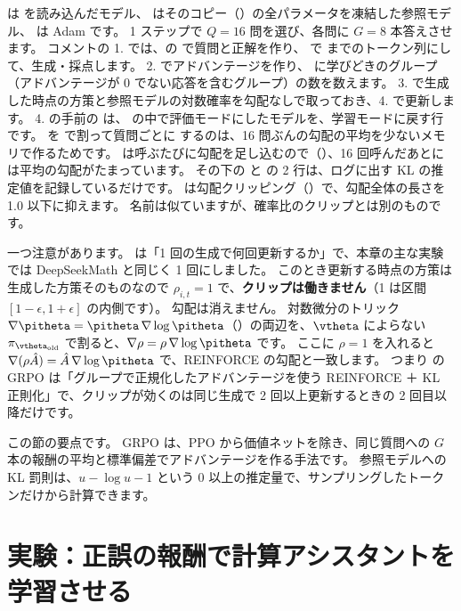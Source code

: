  は  を読み込んだモデル、 はそのコピー（）の全パラメータを凍結した参照モデル、 は Adam です。
1 ステップで $Q=16$ 問を選び、各問に $G=8$ 本答えさせます。
コメントの 1. では、の  で質問と正解を作り、 で  までのトークン列にして、生成・採点します。
2. でアドバンテージを作り、 に学びどきのグループ（アドバンテージが 0 でない応答を含むグループ）の数を数えます。
3. で生成した時点の方策と参照モデルの対数確率を勾配なしで取っておき、4. で更新します。
4. の手前の  は、 の中で評価モードにしたモデルを、学習モードに戻す行です。
 を  で割って質問ごとに  するのは、16 問ぶんの勾配の平均を少ないメモリで作るためです。
 は呼ぶたびに勾配を足し込むので（）、16 回呼んだあとには平均の勾配がたまっています。
その下の  と  の 2 行は、ログに出す KL の推定値を記録しているだけです。
 は勾配クリッピング（）で、勾配全体の長さを 1.0 以下に抑えます。
名前は似ていますが、確率比のクリップとは別のものです。

一つ注意があります。
 は「1 回の生成で何回更新するか」で、本章の主な実験では DeepSeekMath と同じく 1 回にしました。
このとき更新する時点の方策は生成した方策そのものなので $\rho_{i,t}=1$ で、\textbf{クリップは働きません}（1 は区間 $[1-\epsilon,1+\epsilon]$ の内側です）。
勾配は消えません。
対数微分のトリック $\nabla\pitheta=\pitheta\,\nabla\log\pitheta$（）の両辺を、$\vtheta$ によらない $\pi_{\vtheta_{\text{old}}}$ で割ると、$\nabla\rho=\rho\,\nabla\log\pitheta$ です。
ここに $\rho=1$ を入れると $\nabla(\rho\hat A)=\hat A\,\nabla\log\pitheta$ で、REINFORCE の勾配と一致します。
つまり  の GRPO は「グループで正規化したアドバンテージを使う REINFORCE ＋ KL 正則化」で、クリップが効くのは同じ生成で 2 回以上更新するときの 2 回目以降だけです。

この節の要点です。
GRPO は、PPO から価値ネットを除き、同じ質問への $G$ 本の報酬の平均と標準偏差でアドバンテージを作る手法です。
参照モデルへの KL 罰則は、$u-\log u-1$ という 0 以上の推定量で、サンプリングしたトークンだけから計算できます。

\section{実験：正誤の報酬で計算アシスタントを学習させる}\label{sec:rl-exp}

